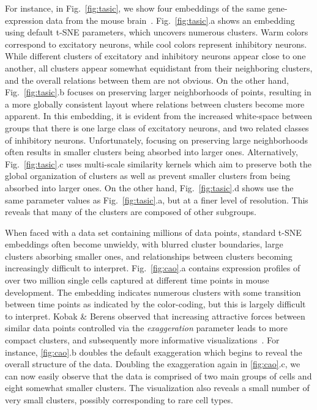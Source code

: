 \documentclass[twocolumn]{bmcart}
\begin{document}
For instance, in Fig.~\ref{fig:tasic}, we show four embeddings of the same gene-expression data from the mouse brain~\cite{tasic2018shared}. Fig.~\ref{fig:tasic}.a shows an embedding using default t-SNE parameters, which uncovers numerous clusters. Warm colors correspond to excitatory neurons, while cool colors represent inhibitory neurons. While different clusters of excitatory and inhibitory neurons appear close to one another, all clusters appear somewhat equidistant from their neighboring clusters, and the overall relations between them are not obvious. On the other hand, Fig.~\ref{fig:tasic}.b focuses on preserving larger neighborhoods of points, resulting in a more globally consistent layout where relations between clusters become more apparent. In this embedding, it is evident from the increased white-space between groups that there is one large class of excitatory neurons, and two related classes of inhibitory neurons. Unfortunately, focusing on preserving large neighborhoods often results in smaller clusters being absorbed into larger ones. Alternatively, Fig.~\ref{fig:tasic}.c uses multi-scale similarity kernels which aim to preserve both the global organization of clusters as well as prevent smaller clusters from being absorbed into larger ones. On the other hand, Fig.~\ref{fig:tasic}.d shows use the same parameter values as Fig.~\ref{fig:tasic}.a, but at a finer level of resolution. This reveals that many of the clusters are composed of other subgroups.

When faced with a data set containing millions of data points, standard t-SNE embeddings often become unwieldy, with blurred cluster boundaries, large clusters absorbing smaller ones, and relationships between clusters becoming increasingly difficult to interpret. Fig.~\ref{fig:cao}.a contains expression profiles of over two million single cells captured at different time points in mouse development. The embedding indicates numerous clusters with some transition between time points as indicated by the color-coding, but this is largely difficult to interpret. Kobak \& Berens observed that increasing attractive forces between similar data points controlled via the \textit{exaggeration} parameter leads to more compact clusters, and subsequently more informative visualizations~\cite{kobak2019art}. For instance, \ref{fig:cao}.b doubles the default exaggeration  which begins to reveal the overall structure of the data. Doubling the exaggeration again in \ref{fig:cao}.c, we can now easily observe that the data is comprised of two main groups of cells and eight somewhat smaller clusters. The visualization also reveals a small number of very small clusters, possibly corresponding to rare cell types.
\end{document}
